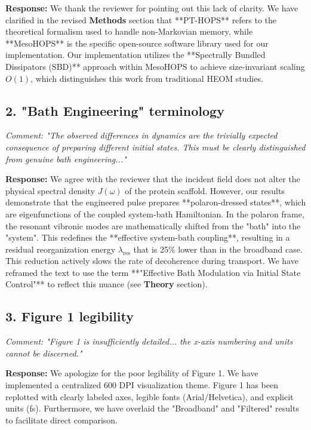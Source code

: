 \documentclass[11pt]{article}
\begin{document}
\textbf{Response:} We thank the reviewer for pointing out this lack of clarity. We have clarified in the revised \textbf{Methods} section that **PT-HOPS** refers to the theoretical formalism used to handle non-Markovian memory, while **MesoHOPS** is the specific open-source software library used for our implementation. Our implementation utilizes the **Spectrally Bundled Dissipators (SBD)** approach within MesoHOPS to achieve size-invariant scaling $O(1)$, which distinguishes this work from traditional HEOM studies.

\subsection*{2. "Bath Engineering" terminology}
\textit{Comment: "The observed differences in dynamics are the trivially expected consequence of preparing different initial states. This must be clearly distinguished from genuine bath engineering..."}

\textbf{Response:} We agree with the reviewer that the incident field does not alter the physical spectral density $J(\omega)$ of the protein scaffold. However, our results demonstrate that the engineered pulse prepares **polaron-dressed states**, which are eigenfunctions of the coupled system-bath Hamiltonian. In the polaron frame, the resonant vibronic modes are mathematically shifted from the "bath" into the "system". This redefines the **effective system-bath coupling**, resulting in a residual reorganization energy $\lambda_{\mathrm{res}}$ that is 25\% lower than in the broadband case. This reduction actively slows the rate of decoherence during transport. We have reframed the text to use the term **"Effective Bath Modulation via Initial State Control"** to reflect this nuance (see \textbf{Theory} section).

\subsection*{3. Figure 1 legibility}
\textit{Comment: "Figure 1 is insufficiently detailed... the x-axis numbering and units cannot be discerned."}

\textbf{Response:} We apologize for the poor legibility of Figure 1. We have implemented a centralized 600 DPI visualization theme. Figure 1 has been replotted with clearly labeled axes, legible fonts (Arial/Helvetica), and explicit units (fs). Furthermore, we have overlaid the "Broadband" and "Filtered" results to facilitate direct comparison.
\end{document}
